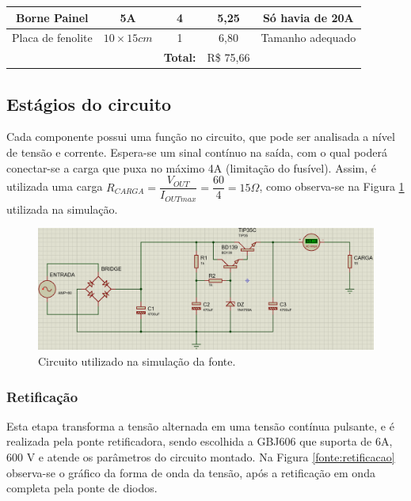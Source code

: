 \documentclass[a4paper,12pt,oneside,openany,table,xcdraw]{article}
\begin{document}
\begin{table}[H]
{\begin{tabular}{cc|c|c|c}
\multicolumn{1}{|c|}{Borne Painel}                  & 5A                     & 4                   & 	5,25	  & \multicolumn{1}{c|}{Só havia de 20A}       \\ \hline
\multicolumn{1}{|c|}{Placa de fenolite}             & $10\times 15cm$        & 1                   & 6,80                         & \multicolumn{1}{c|}{Tamanho adequado}      \\ \hline
                                                    &                        & \textbf{Total:}     & R\$ 75,66                    &                                            \\ \cline{3-4}
\end{tabular}%
}
\end{table}

\vspace{0.8cm}
\subsection{Estágios do circuito} %
Cada componente possui uma função no circuito, que pode ser analisada a nível de tensão e corrente. Espera-se um sinal contínuo na saída, com o qual poderá conectar-se a carga que puxa no máximo 4A (limitação do fusível). Assim, é utilizada uma carga $R_{CARGA}=\dfrac{V_{OUT}}{I_{OUTmax}}=\dfrac{60}{4}=15\Omega$, como observa-se na Figura \ref{fonte:simulacao:circuito} utilizada na simulação.
\vspace{0.6cm}

\begin{figure}[H]
\centering
\includegraphics[width=15cm]{fonte-simulacao-circuito}
\caption{Circuito utilizado na simulação da fonte.}
\label{fonte:simulacao:circuito}
\end{figure}
\vspace{0.3cm}

\subsubsection{Retificação}
Esta etapa transforma a tensão alternada em uma tensão contínua pulsante, e é realizada pela ponte retificadora, sendo escolhida a GBJ606 que suporta de 6A, 600 V e atende os parâmetros do circuito montado. Na Figura \ref{fonte:retificacao} observa-se o gráfico da forma de onda da tensão, após a retificação em onda completa pela ponte de diodos.
 
\end{document}
